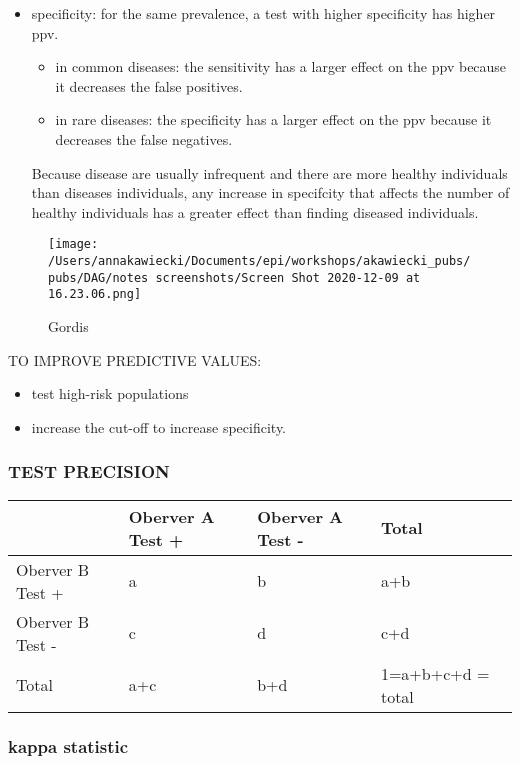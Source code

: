\documentclass[
]{article}
\begin{document}
\begin{itemize}
\item
  specificity: for the same prevalence, a test with higher specificity
  has higher ppv.

  \begin{itemize}
  \item
    in common diseases: the sensitivity has a larger effect on the ppv
    because it decreases the false positives.
  \item
    in rare diseases: the specificity has a larger effect on the ppv
    because it decreases the false negatives.
  \end{itemize}

  Because disease are usually infrequent and there are more healthy
  individuals than diseases individuals, any increase in specifcity that
  affects the number of healthy individuals has a greater effect than
  finding diseased individuals.
\end{itemize}

\begin{figure}
\centering
\texttt{[image: /Users/annakawiecki/Documents/epi/workshops/akawiecki\_pubs/pubs/DAG/notes screenshots/Screen Shot 2020-12-09 at 16.23.06.png]}
\caption{Gordis}
\end{figure}

TO IMPROVE PREDICTIVE VALUES:

\begin{itemize}
\item
  test high-risk populations
\item
  increase the cut-off to increase specificity.
\end{itemize}

\hypertarget{test-precision}{%
\subsubsection{TEST PRECISION}\label{test-precision}}

\begin{longtable}[]{@{}llll@{}}
\toprule
& Oberver A Test + & Oberver A Test - & Total\tabularnewline
\midrule
\endhead
Oberver B Test + & a & b & a+b\tabularnewline
Oberver B Test - & c & d & c+d\tabularnewline
Total & a+c & b+d & 1=a+b+c+d = total\tabularnewline
\bottomrule
\end{longtable}

\hypertarget{kappa-statistic}{%
\subsubsection{kappa statistic}\label{kappa-statistic}}
\end{document}
